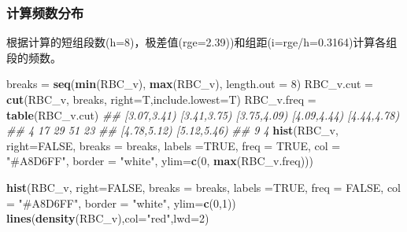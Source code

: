 \documentclass[
]{article}
\newenvironment{Shaded}{\begin{snugshade}}{\end{snugshade}}
\newcommand{\CommentTok}[1]{\textcolor[rgb]{0.56,0.35,0.01}{\textit{#1}}}
\newcommand{\DataTypeTok}[1]{\textcolor[rgb]{0.13,0.29,0.53}{#1}}
\newcommand{\DecValTok}[1]{\textcolor[rgb]{0.00,0.00,0.81}{#1}}
\newcommand{\KeywordTok}[1]{\textcolor[rgb]{0.13,0.29,0.53}{\textbf{#1}}}
\newcommand{\NormalTok}[1]{#1}
\newcommand{\OtherTok}[1]{\textcolor[rgb]{0.56,0.35,0.01}{#1}}
\newcommand{\StringTok}[1]{\textcolor[rgb]{0.31,0.60,0.02}{#1}}
\begin{document}
\hypertarget{ux8ba1ux7b97ux9891ux6570ux5206ux5e03}{%
\subsubsection{计算频数分布}\label{ux8ba1ux7b97ux9891ux6570ux5206ux5e03}}

根据计算的短组段数(h=8)，极差值(rge=2.39))和组距(i=rge/h=0.3164)计算各组段的频数。

\begin{Shaded}
\begin{Highlighting}[]
\NormalTok{breaks =}\StringTok{ }\KeywordTok{seq}\NormalTok{(}\KeywordTok{min}\NormalTok{(RBC_v), }\KeywordTok{max}\NormalTok{(RBC_v), }\DataTypeTok{length.out =} \DecValTok{8}\NormalTok{)}
\NormalTok{RBC_v.cut =}\StringTok{ }\KeywordTok{cut}\NormalTok{(RBC_v, breaks, }\DataTypeTok{right=}\NormalTok{T,}\DataTypeTok{include.lowest=}\NormalTok{T)}
\NormalTok{RBC_v.freq =}\StringTok{ }\KeywordTok{table}\NormalTok{(RBC_v.cut)}
\CommentTok{## [3.07,3.41) [3.41,3.75) [3.75,4.09) [4.09,4.44) [4.44,4.78) }
\CommentTok{##          4          17          29          51          23 }
\CommentTok{## [4.78,5.12) [5.12,5.46) }
\CommentTok{##          9           4 }
\KeywordTok{hist}\NormalTok{(RBC_v, }\DataTypeTok{right=}\OtherTok{FALSE}\NormalTok{, }
     \DataTypeTok{breaks =}\NormalTok{ breaks, }\DataTypeTok{labels =}\OtherTok{TRUE}\NormalTok{, }
     \DataTypeTok{freq =} \OtherTok{TRUE}\NormalTok{, }\DataTypeTok{col =} \StringTok{"#A8D6FF"}\NormalTok{, }
     \DataTypeTok{border =} \StringTok{"white"}\NormalTok{, }\DataTypeTok{ylim=}\KeywordTok{c}\NormalTok{(}\DecValTok{0}\NormalTok{, }\KeywordTok{max}\NormalTok{(RBC_v.freq))) }

\KeywordTok{hist}\NormalTok{(RBC_v, }\DataTypeTok{right=}\OtherTok{FALSE}\NormalTok{, }
      \DataTypeTok{breaks =}\NormalTok{ breaks, }\DataTypeTok{labels =}\OtherTok{TRUE}\NormalTok{, }
      \DataTypeTok{freq =} \OtherTok{FALSE}\NormalTok{, }\DataTypeTok{col =} \StringTok{"#A8D6FF"}\NormalTok{, }
      \DataTypeTok{border =} \StringTok{"white"}\NormalTok{, }\DataTypeTok{ylim=}\KeywordTok{c}\NormalTok{(}\DecValTok{0}\NormalTok{,}\DecValTok{1}\NormalTok{))}
\KeywordTok{lines}\NormalTok{(}\KeywordTok{density}\NormalTok{(RBC_v),}\DataTypeTok{col=}\StringTok{"red"}\NormalTok{,}\DataTypeTok{lwd=}\DecValTok{2}\NormalTok{)}
\end{Highlighting}
\end{Shaded}
\end{document}
